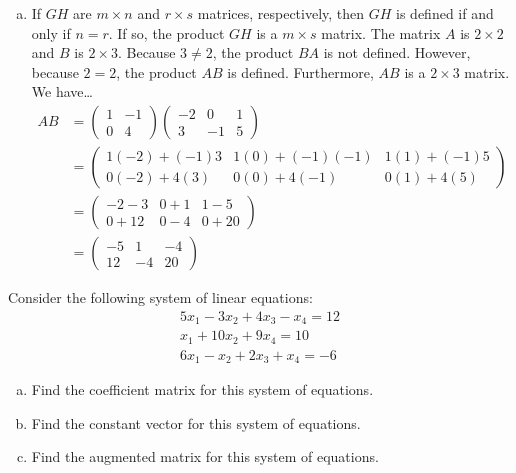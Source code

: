\documentclass[12pt,letterpaper]{exam}
\begin{document}
\begin{questions}
\begin{enumerate}[(a)]
\item If $GH$ are $m \times n$ and $r \times s$ matrices, respectively, then $GH$ is defined if and only if $n= r$. If so, the product $GH$ is a $m \times s$ matrix. The matrix $A$ is $2 \times 2$ and $B$ is $2 \times 3$. Because $3 \neq 2$, the product $BA$ is not defined. However, because $2= 2$, the product $AB$ is defined. Furthermore, $AB$ is a $2 \times 3$ matrix. We have\dots
	\[
	\begin{aligned}
	AB&= \begin{pmatrix} 1 & -1 \\ 0 & 4 \end{pmatrix} \begin{pmatrix} -2 & 0 & 1 \\ 3 & -1 & 5 \end{pmatrix} \\[0.3cm]
	&= \begin{pmatrix}1(-2) + (-1)3 & 1(0) + (-1)(-1) & 1(1) + (-1)5 \\ 0(-2) + 4(3) & 0(0) + 4(-1) & 0(1) + 4(5) \end{pmatrix} \\[0.3cm]
	&= \begin{pmatrix} -2 - 3 & 0 + 1 & 1 - 5 \\ 0 + 12 & 0 - 4 & 0 + 20 \end{pmatrix} \\[0.3cm]
	&= \begin{pmatrix} -5 & 1 & -4 \\ 12 & -4 & 20 \end{pmatrix}
	\end{aligned}
	\]
\end{enumerate}



\newpage
\question[10] Consider the following system of linear equations:
	\[
	\begin{aligned}
	5x_1 - 3x_2 + 4x_3 - x_4= 12 \\
	x_1 + 10x_2 + 9x_4= 10 \\
	6x_1 - x_2 + 2x_3 + x_4= -6
	\end{aligned}
	\]

\begin{enumerate}[(a)]
\item Find the coefficient matrix for this system of equations. 
\item Find the constant vector for this system of equations.
\item Find the augmented matrix for this system of equations. 
\end{enumerate} \pspace


\end{questions}
\end{document}
